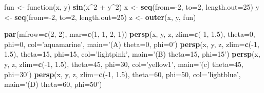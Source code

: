 \documentclass[10pt,]{krantz}
\makeatletter
\newenvironment{Shaded}{\begin{snugshade}}{\end{snugshade}}
\newcommand{\KeywordTok}[1]{\textcolor[rgb]{0.13,0.29,0.53}{\textbf{{#1}}}}
\newcommand{\DataTypeTok}[1]{\textcolor[rgb]{0.13,0.29,0.53}{{#1}}}
\newcommand{\DecValTok}[1]{\textcolor[rgb]{0.00,0.00,0.81}{{#1}}}
\newcommand{\FloatTok}[1]{\textcolor[rgb]{0.00,0.00,0.81}{{#1}}}
\newcommand{\StringTok}[1]{\textcolor[rgb]{0.31,0.60,0.02}{{#1}}}
\newcommand{\NormalTok}[1]{{#1}}
\newenvironment{kframe}{%
\medskip{}
\setlength{\fboxsep}{.8em}
 \def\at@end@of@kframe{}%
 \ifinner\ifhmode%
  \def\at@end@of@kframe{\end{minipage}}%
  \begin{minipage}{\columnwidth}%
 \fi\fi%
 \def\FrameCommand##1{\hskip\@totalleftmargin \hskip-\fboxsep
 \colorbox{shadecolor}{##1}\hskip-\fboxsep
     \hskip-\linewidth \hskip-\@totalleftmargin \hskip\columnwidth}%
 \MakeFramed {\advance\hsize-\width
   \@totalleftmargin\z@ \linewidth\hsize
   \@setminipage}}%
 {\par\unskip\endMakeFramed%
 \at@end@of@kframe}
\renewenvironment{Shaded}{\begin{kframe}}{\end{kframe}}
\makeatother
\begin{document}
\begin{Shaded}
\begin{Highlighting}[]
\NormalTok{fun <-}\StringTok{ }\NormalTok{function(x, y)   }\KeywordTok{sin}\NormalTok{(x^}\DecValTok{2} \NormalTok{+}\StringTok{ }\NormalTok{y^}\DecValTok{2}\NormalTok{)}
\NormalTok{x <-}\StringTok{ }\KeywordTok{seq}\NormalTok{(}\DataTypeTok{from=}\NormalTok{-}\DecValTok{2}\NormalTok{, }\DataTypeTok{to=}\DecValTok{2}\NormalTok{, }\DataTypeTok{length.out=}\DecValTok{25}\NormalTok{)}
\NormalTok{y <-}\StringTok{ }\KeywordTok{seq}\NormalTok{(}\DataTypeTok{from=}\NormalTok{-}\DecValTok{2}\NormalTok{, }\DataTypeTok{to=}\DecValTok{2}\NormalTok{, }\DataTypeTok{length.out=}\DecValTok{25}\NormalTok{)}
\NormalTok{z <-}\StringTok{ }\KeywordTok{outer}\NormalTok{(x, y, fun)}

\KeywordTok{par}\NormalTok{(}\DataTypeTok{mfrow=}\KeywordTok{c}\NormalTok{(}\DecValTok{2}\NormalTok{, }\DecValTok{2}\NormalTok{), }\DataTypeTok{mar=}\KeywordTok{c}\NormalTok{(}\DecValTok{1}\NormalTok{, }\DecValTok{1}\NormalTok{, }\DecValTok{2}\NormalTok{, }\DecValTok{1}\NormalTok{))}
\KeywordTok{persp}\NormalTok{(x, y, z, }\DataTypeTok{zlim=}\KeywordTok{c}\NormalTok{(-}\DecValTok{1}\NormalTok{, }\FloatTok{1.5}\NormalTok{), }\DataTypeTok{theta=}\DecValTok{0}\NormalTok{, }\DataTypeTok{phi=}\DecValTok{0}\NormalTok{, }\DataTypeTok{col=}\StringTok{'aquamarine'}\NormalTok{,}
      \DataTypeTok{main=}\StringTok{'(A) theta=0, phi=0'}\NormalTok{)}
\KeywordTok{persp}\NormalTok{(x, y, z, }\DataTypeTok{zlim=}\KeywordTok{c}\NormalTok{(-}\DecValTok{1}\NormalTok{, }\FloatTok{1.5}\NormalTok{), }\DataTypeTok{theta=}\DecValTok{15}\NormalTok{, }\DataTypeTok{phi=}\DecValTok{15}\NormalTok{, }\DataTypeTok{col=}\StringTok{'lightpink'}\NormalTok{,}
      \DataTypeTok{main=}\StringTok{'(B) theta=15, phi=15'}\NormalTok{)}
\KeywordTok{persp}\NormalTok{(x, y, z, }\DataTypeTok{zlim=}\KeywordTok{c}\NormalTok{(-}\DecValTok{1}\NormalTok{, }\FloatTok{1.5}\NormalTok{), }\DataTypeTok{theta=}\DecValTok{45}\NormalTok{, }\DataTypeTok{phi=}\DecValTok{30}\NormalTok{, }\DataTypeTok{col=}\StringTok{'yellow1'}\NormalTok{,}
      \DataTypeTok{main=}\StringTok{'(c) theta=45, phi=30'}\NormalTok{)}
\KeywordTok{persp}\NormalTok{(x, y, z, }\DataTypeTok{zlim=}\KeywordTok{c}\NormalTok{(-}\DecValTok{1}\NormalTok{, }\FloatTok{1.5}\NormalTok{), }\DataTypeTok{theta=}\DecValTok{60}\NormalTok{, }\DataTypeTok{phi=}\DecValTok{50}\NormalTok{, }\DataTypeTok{col=}\StringTok{'lightblue'}\NormalTok{,}
      \DataTypeTok{main=}\StringTok{'(D) theta=60, phi=50'}\NormalTok{)}
\end{Highlighting}
\end{Shaded}
\end{document}
